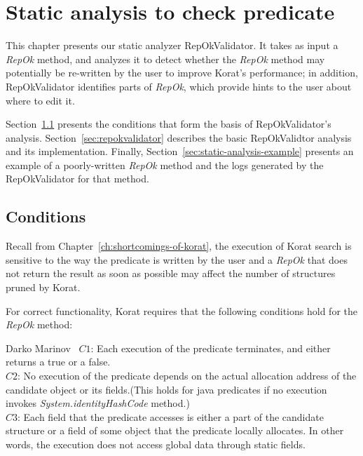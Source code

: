 \chapter{Static analysis to check predicate}
\label{ch:static-analysis}
This chapter presents our static analyzer RepOkValidator.  It takes as
input a \emph{RepOk} method, and analyzes it to detect whether the \emph{RepOk}
method may potentially be re-written by the user to improve Korat's
performance; in addition, RepOkValidator identifies parts of \emph{RepOk},
which provide hints to the user about where to edit it.

Section~\ref{sec:static-analysis-conditions} presents the conditions
that form the basis of RepOkValidator's analysis.
Section~\ref{sec:repokvalidator} describes the basic RepOkValidtor
analysis and its implementation.  Finally,
Section~\ref{sec:static-analysis-example} presents an example of a poorly-written
\emph{RepOk} method and the logs generated by the RepOkValidator for
that method.

\section{Conditions}
\label{sec:static-analysis-conditions}
Recall from Chapter~\ref{ch:shortcomings-of-korat}, the execution of
Korat search is sensitive to the way the predicate is written by the
user and a \emph{RepOk} that does not return the result as soon as
possible may affect the number of structures pruned by Korat.

For correct functionality, Korat requires\cite{marinov2005automatic}
that the following conditions hold for the \emph{RepOk} method:

\begin{aquote}{Darko Marinov~\cite{marinov2005automatic}}
$C1$: Each execution of the predicate terminates, and either returns a
true or a false.\\ 
$C2$: No execution of the predicate depends on the actual allocation
address of the candidate object or its fields.(This holds for java
predicates if no execution invokes \emph{System.identityHashCode}
method.)\\ 
$C3$: Each field that the predicate accesses is either a part of the
candidate structure or a field of some object that the predicate
locally allocates. In other words, the execution does not access
global data through static fields.\\
\end{aquote}

